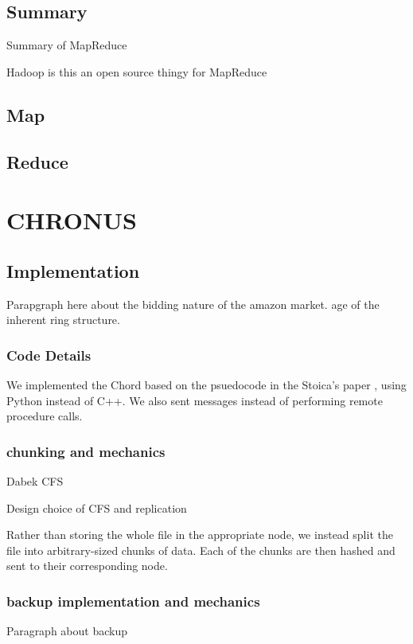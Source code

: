 \documentclass[conference, compsocconf, letterpaper]{IEEEtran}
\begin{document}
\subsection{Summary}

Summary of MapReduce \cite{mapreduce} 

Hadoop is this an open source thingy for MapReduce \cite{hadoop}

\subsection{Map}
\subsection{Reduce}


\section{CHRONUS}




\subsection{Implementation}
Parapgraph here about the bidding nature of the amazon market.
age of the inherent ring structure.





\subsubsection{Code Details}
We implemented the Chord based on the psuedocode  in the Stoica's paper \cite{Chord}, using Python instead of C++.  We also sent messages instead of performing remote procedure calls.


\subsubsection{chunking and mechanics }

Dabek CFS \cite{CFS}

Design choice of CFS and replication 


Rather than storing the whole file in the appropriate node, we instead split the file into arbitrary-sized chunks of data.  Each of the chunks are then hashed and sent to their corresponding node.

\subsubsection{backup implementation and mechanics}
Paragraph about backup
\end{document}
